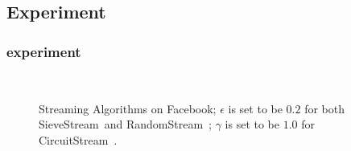 \documentclass{beamer}
\newcommand{\eps}{\epsilon}
\newcommand{\sieveStream}{{\sc SieveStream}~}
\newcommand{\randomStream}{{\sc RandomStream}~}
\newcommand{\circuitStream}{{\sc CircuitStream}~}
\begin{document}
\subsection{Experiment}
\begin{frame}
  \frametitle{experiment}
  
  \begin{figure}[h!]
    \centering
    ~~
    \caption{Streaming Algorithms on {\sc Facebook};  $\eps$ is set to be $0.2$ for both \sieveStream and \randomStream; $\gamma$ is set to be $1.0$ for \circuitStream.}
    \label{fig:streaming-facebook}
  \end{figure}
\end{frame}
\end{document}
